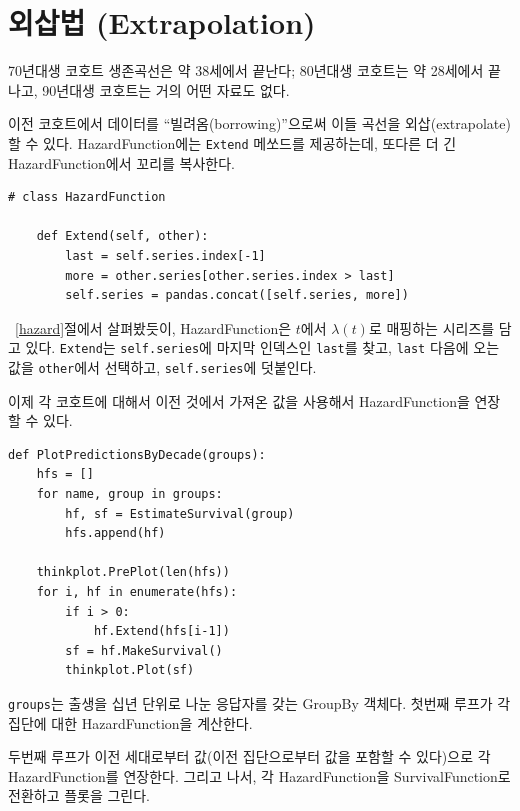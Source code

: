 \section{외삽법 (Extrapolation)}

70년대생 코호트 생존곡선은 약 38세에서 끝난다; 80년대생 코호트는 약 28세에서 끝나고, 90년대생 코호트는 거의 어떤 자료도 없다.

이전 코호트에서 데이터를 ``빌려옴(borrowing)''으로써 이들 곡선을 외삽(extrapolate)할 수 있다. 
HazardFunction에는 {\tt Extend} 메쏘드를 제공하는데, 또다른 더 긴 HazardFunction에서 꼬리를 복사한다.

\begin{verbatim}
# class HazardFunction

    def Extend(self, other):
        last = self.series.index[-1]
        more = other.series[other.series.index > last]
        self.series = pandas.concat([self.series, more])
\end{verbatim}

~\ref{hazard}절에서 살펴봤듯이, HazardFunction은 $t$에서 $\lambda(t)$로 매핑하는 시리즈를 담고 있다. {\tt Extend}는 {\tt self.series}에 마지막 인덱스인 {\tt last}를 찾고, {\tt last} 다음에 오는 값을 {\tt other}에서 선택하고, {\tt self.series}에 덧붙인다.

이제 각 코호트에 대해서 이전 것에서 가져온 값을 사용해서 HazardFunction을 연장할 수 있다.

\begin{verbatim}
def PlotPredictionsByDecade(groups):
    hfs = []
    for name, group in groups:
        hf, sf = EstimateSurvival(group)
        hfs.append(hf)

    thinkplot.PrePlot(len(hfs))
    for i, hf in enumerate(hfs):
        if i > 0:
            hf.Extend(hfs[i-1])
        sf = hf.MakeSurvival()
        thinkplot.Plot(sf)
\end{verbatim}

{\tt groups}는 출생을 십년 단위로 나눈 응답자를 갖는 GroupBy 객체다.
첫번째 루프가 각 집단에 대한 HazardFunction을 계산한다.

두번째 루프가 이전 세대로부터 값(이전 집단으로부터 값을 포함할 수 있다)으로 각 HazardFunction를 연장한다.
그리고 나서, 각 HazardFunction을 SurvivalFunction로 전환하고 플롯을 그린다.

